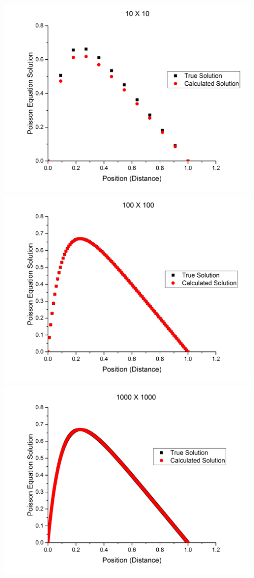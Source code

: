 \documentclass[12pt,righttag]{article}
\begin{document}
	\includegraphics[scale=0.25]{10GridPoisson.png} 
	\includegraphics[scale=0.25]{100GridPoisson.png}
	\includegraphics[scale=0.25]{1000GridPoisson.png}
	
\end{document}
